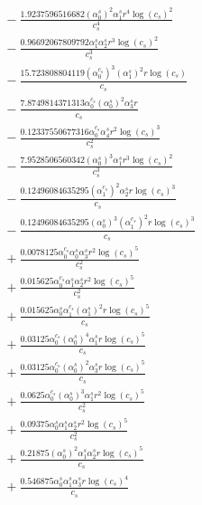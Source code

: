 \documentclass[10pt]{article}
\begin{document}
\begin{align*}
&{}  - \frac{1.9237596516682 \left(\alpha_{0}^s\right)^{2} \alpha_{1}^s r^{4} \log{\left(c_{s} \right)}^{2}}{c_{s}^{4}} \\
&{}  - \frac{0.96692067809792 \alpha_{1}^s \alpha_{2}^s r^{3} \log{\left(c_{s} \right)}^{2}}{c_{s}^{3}} \\
&{}  - \frac{15.723808804119 \left(\alpha_{0}^{c_s}\right)^{3} \left(\alpha_{1}^s\right)^{2} r \log{\left(c_{s} \right)}}{c_{s}} \\
&{}  - \frac{7.8749814371313 \alpha_{0}^{c_s} \left(\alpha_{0}^s\right)^{2} \alpha_{3}^s r}{c_{s}} \\
&{}  - \frac{0.12337550677316 \alpha_{0}^{c_s} \alpha_{4}^s r^{2} \log{\left(c_{s} \right)}^{3}}{c_{s}^{2}} \\
&{}  - \frac{7.9528506560342 \left(\alpha_{0}^s\right)^{3} \alpha_{1}^s r^{3} \log{\left(c_{s} \right)}^{2}}{c_{s}^{3}} \\
&{}  - \frac{0.12496084635295 \left(\alpha_{1}^{c_s}\right)^{2} \alpha_{2}^s r \log{\left(c_{s} \right)}^{3}}{c_{s}} \\
&{}  - \frac{0.12496084635295 \left(\alpha_{0}^s\right)^{3} \left(\alpha_{1}^{c_s}\right)^{2} r \log{\left(c_{s} \right)}^{3}}{c_{s}} \\
&{}  + \frac{0.0078125 \alpha_{0}^{c_s} \alpha_{0}^s \alpha_{3}^s r^{2} \log{\left(c_{s} \right)}^{5}}{c_{s}^{2}} \\
&{}  + \frac{0.015625 \alpha_{0}^{c_s} \alpha_{1}^s \alpha_{2}^s r^{2} \log{\left(c_{s} \right)}^{5}}{c_{s}^{2}} \\
&{}  + \frac{0.015625 \alpha_{0}^s \alpha_{1}^{c_s} \left(\alpha_{1}^s\right)^{2} r \log{\left(c_{s} \right)}^{5}}{c_{s}} \\
&{}  + \frac{0.03125 \alpha_{0}^{c_s} \left(\alpha_{0}^s\right)^{4} \alpha_{1}^s r \log{\left(c_{s} \right)}^{5}}{c_{s}} \\
&{}  + \frac{0.03125 \alpha_{0}^{c_s} \left(\alpha_{0}^s\right)^{2} \alpha_{3}^s r \log{\left(c_{s} \right)}^{5}}{c_{s}} \\
&{}  + \frac{0.0625 \alpha_{0}^{c_s} \left(\alpha_{0}^s\right)^{3} \alpha_{1}^s r^{2} \log{\left(c_{s} \right)}^{5}}{c_{s}^{2}} \\
&{}  + \frac{0.09375 \alpha_{0}^s \alpha_{1}^s \alpha_{2}^s r^{2} \log{\left(c_{s} \right)}^{5}}{c_{s}^{2}} \\
&{}  + \frac{0.21875 \left(\alpha_{0}^s\right)^{2} \alpha_{1}^s \alpha_{2}^s r \log{\left(c_{s} \right)}^{5}}{c_{s}} \\
&{}  + \frac{0.546875 \alpha_{0}^s \alpha_{1}^s \alpha_{3}^s r \log{\left(c_{s} \right)}^{4}}{c_{s}} \\

\end{align*}
\end{document}
